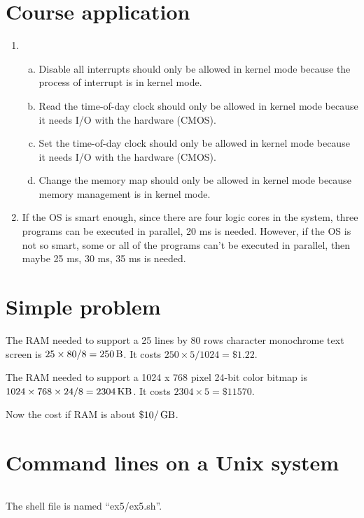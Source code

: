 \documentclass{article}
\newcommand{\unit}[1]{{\rm\,#1}}
\begin{document}
\section{Course application}
\begin{enumerate}
\item
\begin{enumerate}[a)]
\item Disable all interrupts should only be allowed in kernel mode because the process of interrupt is in kernel mode.
\item Read the time-of-day clock should only be allowed in kernel mode because it needs I/O with the hardware (CMOS).
\item Set the time-of-day clock should only be allowed in kernel mode because it needs I/O with the hardware (CMOS).
\item Change the memory map should only be allowed in kernel mode because memory management is in kernel mode.
\end{enumerate}
\item If the OS is smart enough, since there are four logic cores in the system, three programs can be executed in parallel, 20 ms is needed. However, if the OS is not so smart, some or all of the programs can't be executed in parallel, then maybe 25 ms, 30 ms, 35 ms is needed.
\end{enumerate}

\section{Simple problem}
The RAM needed to support a 25 lines by 80 rows character monochrome text screen is $25\times80/8=250\unit{B}$. It costs $250\times5/1024=\$ 1.22$.

The RAM needed to support a 1024 x 768 pixel 24-bit color bitmap is $1024\times768\times24/8=2304\unit{KB}$. It costs $2304\times5=\$ 11570$.

Now the cost if RAM is about $\$10/\unit{GB}$.

\section{Command lines on a Unix system}
\inputminted{shell}{ex5/ex5.sh}
The shell file is named ``ex5/ex5.sh''.
\end{document}
